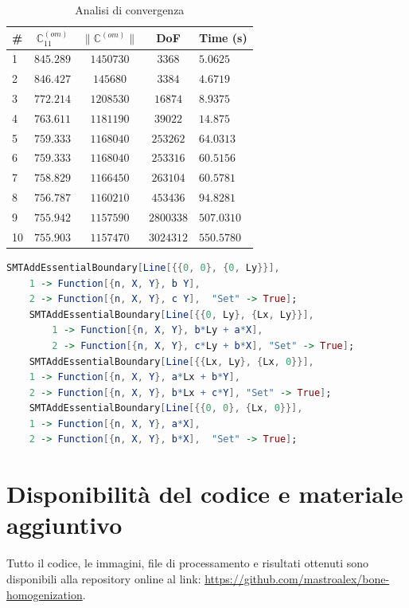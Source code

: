 \documentclass[a4paper,num-refs]{oup-contemporary}
\begin{document}
\begin{table}[bt!]
	\caption{Analisi di convergenza}\label{tab:convergence}
	\begin{tabular}{l c c c l}
		\toprule
\#&	$\mathbb C_{11}^{(om)}$ & $\| \mathbb C^{(om)}\| $ &DoF &  Time (s)\\
		\midrule

		
	1&		$845.289$ &$1450730 $ &$3368 $ &  $ 5.0625 $\\
			2&	$846.427$ &$145680 $& $3384$ &  $4.6719  $\\
			3&	$ 772.214$ &$1208530 $&$ 16874$  &  $ 8.9375 $\\
			4&$ 763.611$ &$ 1181190$&$ 39022$  &$ 14.875$   \\
			5&$ 759.333$ &$1168040 $&$ 253262$  & $ 64.0313$     \\
		6&	$ 759.333$ &$1168040 $& $ 253316$  &$ 60.5156$     \\
		7&	$758.829 $ &$1166450 $&$ 263104$   &$ 60.5781$     \\
		8&	$ 756.787$ &$ 1160210$&$ 453436$ &$ 94.8281 $     \\
		9&	$ 755.942$ &$1157590 $&$2800338 $  &  $ 507.0310$    \\
		10&	$755.903 $ &$ 1157470$&$ 3024312$  & $550.5780 $    \\
		\bottomrule
	\end{tabular}
\end{table}


\begin{lstlisting}[language=Mathematica,caption=Generazione RVE,label=code_displacem]
	SMTAddEssentialBoundary[Line[{{0, 0}, {0, Ly}}],
	1 -> Function[{n, X, Y}, b Y],
	2 -> Function[{n, X, Y}, c Y], 	"Set" -> True];
	SMTAddEssentialBoundary[Line[{{0, Ly}, {Lx, Ly}}],
		1 -> Function[{n, X, Y}, b*Ly + a*X],
		2 -> Function[{n, X, Y}, c*Ly + b*X], "Set" -> True];
	SMTAddEssentialBoundary[Line[{{Lx, Ly}, {Lx, 0}}], 
	1 -> Function[{n, X, Y}, a*Lx + b*Y],
	2 -> Function[{n, X, Y}, b*Lx + c*Y], "Set" -> True];
	SMTAddEssentialBoundary[Line[{{0, 0}, {Lx, 0}}],
	1 -> Function[{n, X, Y}, a*X],
	2 -> Function[{n, X, Y}, b*X], 	"Set" -> True];
\end{lstlisting}

\section{Disponibilità del codice e materiale aggiuntivo}

Tutto il codice, le immagini, file di processamento e risultati ottenuti sono disponibili alla repository online al link: \url{https://github.com/mastroalex/bone-homogenization}. 
\end{document}
